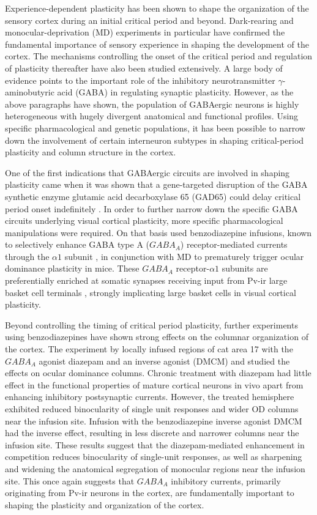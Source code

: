 Experience-dependent plasticity has been shown to shape the
organization of the sensory cortex during an initial critical period and
beyond. Dark-rearing \citep{Fregnac1978} and monocular-deprivation
(MD) experiments \citep{Shatz1978} in particular have confirmed the
fundamental importance of sensory experience in shaping the
development of the cortex. The mechanisms controlling the onset of the
critical period and regulation of plasticity thereafter have also been
studied extensively.  A large body of evidence points to the
important role of the inhibitory neurotransmitter
$\gamma$-aminobutyric acid (GABA) in regulating synaptic
plasticity. However, as the above paragraphs have shown, the population
of GABAergic neurons is highly heterogeneous with hugely divergent
anatomical and functional profiles. Using specific pharmacological and
genetic populations, it has been possible to narrow down the
involvement of certain interneuron subtypes in shaping critical-period
plasticity and column structure in the cortex.

One of the first indications that GABAergic circuits are involved in
shaping plasticity came when it was shown that a gene-targeted
disruption of the GABA synthetic enzyme glutamic acid decarboxylase 65
(GAD65) could delay critical period onset indefinitely
\citep{Fagiolini2000}. In order to further narrow down the specific
GABA circuits underlying visual cortical plasticity, more specific
pharmacological manipulations were required. On that basis
\cite{Fagiolini2004} used benzodiazepine infusions, known to
selectively enhance GABA type A ($GABA_A$) receptor-mediated currents
through the $\alpha1$ subunit \citep{Rudolph1999}, in conjunction with
MD to prematurely trigger ocular dominance plasticity in mice. These
$GABA_A$ receptor-$\alpha1$ subunits are preferentially enriched at
somatic synapses receiving input from Pv-ir large basket cell
terminals \citep{Klausberger2002}, strongly implicating large basket
cells in visual cortical plasticity.

Beyond controlling the timing of critical period plasticity, further
experiments using benzodiazepines have shown strong effects on the
columnar organization of the cortex. The experiment by
\cite{Hensch2004} locally infused regions of cat area 17 with the
$GABA_A$ agonist diazepam and an inverse agonist (DMCM) and studied
the effects on ocular dominance columns. Chronic treatment with
diazepam had little effect in the functional properties of mature
cortical neurons in vivo apart from enhancing inhibitory postsynaptic
currents. However, the treated hemisphere exhibited reduced
binocularity of single unit responses and wider OD columns near the
infusion site. Infusion with the benzodiazepine inverse agonist DMCM
had the inverse effect, resulting in less discrete and narrower
columns near the infusion site. These results suggest that the
diazepam-mediated enhancement in competition reduces binocularity of
single-unit responses, as well as sharpening and widening the
anatomical segregation of monocular regions near the infusion
site. This once again suggests that $GABA_A$ inhibitory currents,
primarily originating from Pv-ir neurons in the cortex, are
fundamentally important to shaping the plasticity and organization of
the cortex.

